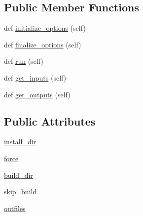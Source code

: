 \subsection*{Public Member Functions}
\begin{DoxyCompactItemize}
\item 
def \hyperlink{classsetuptools_1_1__distutils_1_1command_1_1install__scripts_1_1install__scripts_a8bfd60f942c4722df9996232811f71e4}{initialize\+\_\+options} (self)
\item 
def \hyperlink{classsetuptools_1_1__distutils_1_1command_1_1install__scripts_1_1install__scripts_a4d97a1ab7c1052ebed07d10c4e0dc775}{finalize\+\_\+options} (self)
\item 
def \hyperlink{classsetuptools_1_1__distutils_1_1command_1_1install__scripts_1_1install__scripts_aafd2f192eafa5871a13809b78472b129}{run} (self)
\item 
def \hyperlink{classsetuptools_1_1__distutils_1_1command_1_1install__scripts_1_1install__scripts_a91a6d3c7391249f55fd880c47e6b8150}{get\+\_\+inputs} (self)
\item 
def \hyperlink{classsetuptools_1_1__distutils_1_1command_1_1install__scripts_1_1install__scripts_ad06669a916dee67b3113f35a1e431926}{get\+\_\+outputs} (self)
\end{DoxyCompactItemize}
\subsection*{Public Attributes}
\begin{DoxyCompactItemize}
\item 
\hyperlink{classsetuptools_1_1__distutils_1_1command_1_1install__scripts_1_1install__scripts_a38a346cf81139199bee9b4e59fb7cc16}{install\+\_\+dir}
\item 
\hyperlink{classsetuptools_1_1__distutils_1_1command_1_1install__scripts_1_1install__scripts_a8fc7dc0d74729ebca33c4e39f1e6d5e2}{force}
\item 
\hyperlink{classsetuptools_1_1__distutils_1_1command_1_1install__scripts_1_1install__scripts_a0672a39cf4919a803c9acf7b42a2d64d}{build\+\_\+dir}
\item 
\hyperlink{classsetuptools_1_1__distutils_1_1command_1_1install__scripts_1_1install__scripts_a059620129871ba78e7d11cbd84e526de}{skip\+\_\+build}
\item 
\hyperlink{classsetuptools_1_1__distutils_1_1command_1_1install__scripts_1_1install__scripts_a57eaabc20692e9638d46914e49bf3781}{outfiles}
\end{DoxyCompactItemize}
